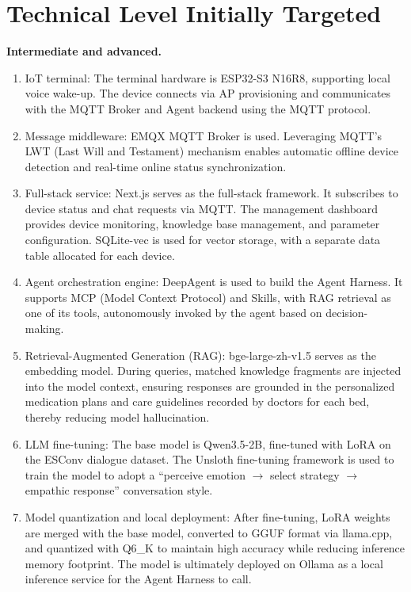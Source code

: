 \documentclass[11pt,a4paper]{article}
\begin{document}
\section{Technical Level Initially Targeted}
\textbf{Intermediate and advanced.}
\begin{enumerate}[leftmargin=*,itemsep=1pt,topsep=2pt]
    \item IoT terminal: The terminal hardware is ESP32-S3 N16R8, supporting local voice wake-up. The device connects via AP provisioning and communicates with the MQTT Broker and Agent backend using the MQTT protocol.
    \item Message middleware: EMQX MQTT Broker is used. Leveraging MQTT's LWT (Last Will and Testament) mechanism enables automatic offline device detection and real-time online status synchronization.
    \item Full-stack service: Next.js serves as the full-stack framework. It subscribes to device status and chat requests via MQTT. The management dashboard provides device monitoring, knowledge base management, and parameter configuration. SQLite-vec is used for vector storage, with a separate data table allocated for each device.
    \item Agent orchestration engine: DeepAgent is used to build the Agent Harness. It supports MCP (Model Context Protocol) and Skills, with RAG retrieval as one of its tools, autonomously invoked by the agent based on decision-making.
    \item Retrieval-Augmented Generation (RAG): bge-large-zh-v1.5 serves as the embedding model. During queries, matched knowledge fragments are injected into the model context, ensuring responses are grounded in the personalized medication plans and care guidelines recorded by doctors for each bed, thereby reducing model hallucination.
    \item LLM fine-tuning: The base model is Qwen3.5-2B, fine-tuned with LoRA on the ESConv dialogue dataset. The Unsloth fine-tuning framework is used to train the model to adopt a ``perceive emotion $\rightarrow$ select strategy $\rightarrow$ empathic response'' conversation style.
    \item Model quantization and local deployment: After fine-tuning, LoRA weights are merged with the base model, converted to GGUF format via llama.cpp, and quantized with Q6\_K to maintain high accuracy while reducing inference memory footprint. The model is ultimately deployed on Ollama as a local inference service for the Agent Harness to call.
\end{enumerate}
\end{document}
